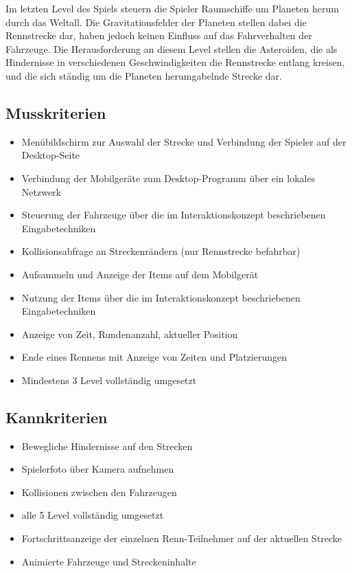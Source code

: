 Im letzten Level des Spiels steuern die Spieler Raumschiffe um Planeten herum durch das Weltall. Die Gravitationsfelder der Planeten stellen dabei die Rennstrecke dar, haben jedoch keinen Einfluss auf das Fahrverhalten der Fahrzeuge. Die Herausforderung an diesem Level stellen die Asteroiden, die als Hindernisse in verschiedenen Geschwindigkeiten die Rennstrecke entlang kreisen, und die sich ständig um die Planeten herumgabelnde Strecke dar.

\subsection{Musskriterien}

\begin{itemize}
\item Menübildschirm zur Auswahl der Strecke und Verbindung der Spieler auf der Desktop-Seite
\item Verbindung der Mobilgeräte zum Desktop-Programm über ein lokales Netzwerk
\item Steuerung der Fahrzeuge über die im Interaktionskonzept beschriebenen Eingabetechniken
\item Kollisionsabfrage an Streckenrändern (nur Rennstrecke befahrbar)
\item Aufsammeln und Anzeige der Items auf dem Mobilgerät
\item Nutzung der Items über die im Interaktionskonzept beschriebenen Eingabetechniken
\item Anzeige von Zeit, Rundenanzahl, aktueller Position
\item Ende eines Rennens mit Anzeige von Zeiten und Platzierungen
\item Mindestens 3 Level vollständig umgesetzt
\end{itemize}

\subsection{Kannkriterien}

\begin{itemize}
\item Bewegliche Hindernisse auf den Strecken
\item Spielerfoto über Kamera aufnehmen
\item Kollisionen zwischen den Fahrzeugen
\item alle 5 Level vollständig umgesetzt
\item Fortschrittsanzeige der einzelnen Renn-Teilnehmer auf der aktuellen Strecke
\item Animierte Fahrzeuge und Streckeninhalte
\end{itemize}
